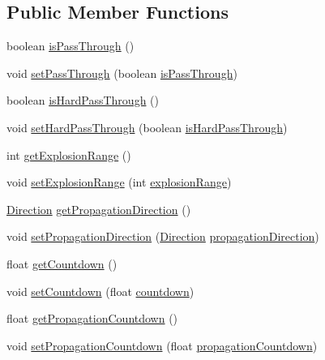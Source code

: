 \subsection*{Public Member Functions}
\begin{DoxyCompactItemize}
\item 
boolean \hyperlink{classbr_1_1unb_1_1unbomber_1_1component_1_1_explosion_aa184c236a60195769dc4c16ae4c7cb64}{is\+Pass\+Through} ()
\item 
void \hyperlink{classbr_1_1unb_1_1unbomber_1_1component_1_1_explosion_ae87c8a59eefdce6d3f6c747feec2ebd2}{set\+Pass\+Through} (boolean \hyperlink{classbr_1_1unb_1_1unbomber_1_1component_1_1_explosion_a09d4a0871d67a4a12a815b354b2272c4}{is\+Pass\+Through})
\item 
boolean \hyperlink{classbr_1_1unb_1_1unbomber_1_1component_1_1_explosion_a361ccb52dcd5922bc52c9e373006c27c}{is\+Hard\+Pass\+Through} ()
\item 
void \hyperlink{classbr_1_1unb_1_1unbomber_1_1component_1_1_explosion_a49bd436b4b1180da8e4ad9f38ba189f4}{set\+Hard\+Pass\+Through} (boolean \hyperlink{classbr_1_1unb_1_1unbomber_1_1component_1_1_explosion_a222793e61a40380a58bab0be162f3088}{is\+Hard\+Pass\+Through})
\item 
int \hyperlink{classbr_1_1unb_1_1unbomber_1_1component_1_1_explosion_ab3fbd42606ad625adcb9f030decdcfb2}{get\+Explosion\+Range} ()
\item 
void \hyperlink{classbr_1_1unb_1_1unbomber_1_1component_1_1_explosion_aaff1ef3e3ba62eed2739ecb1245ef3f6}{set\+Explosion\+Range} (int \hyperlink{classbr_1_1unb_1_1unbomber_1_1component_1_1_explosion_aa8320d23d64b5066cb1c038871d80b90}{explosion\+Range})
\item 
\hyperlink{enumbr_1_1unb_1_1unbomber_1_1component_1_1_direction}{Direction} \hyperlink{classbr_1_1unb_1_1unbomber_1_1component_1_1_explosion_a6c4b805380f1509e0cdb595b5c42b7df}{get\+Propagation\+Direction} ()
\item 
void \hyperlink{classbr_1_1unb_1_1unbomber_1_1component_1_1_explosion_a2c8c31821136f54916ef7a72b3834a45}{set\+Propagation\+Direction} (\hyperlink{enumbr_1_1unb_1_1unbomber_1_1component_1_1_direction}{Direction} \hyperlink{classbr_1_1unb_1_1unbomber_1_1component_1_1_explosion_abf7db2b0cd2eeb4358b6732b07d8e3d1}{propagation\+Direction})
\item 
float \hyperlink{classbr_1_1unb_1_1unbomber_1_1component_1_1_explosion_a3d24659b183a3f526e5b1351af29c0ad}{get\+Countdown} ()
\item 
void \hyperlink{classbr_1_1unb_1_1unbomber_1_1component_1_1_explosion_a343e3012065f6863ab6ee5fa7500c260}{set\+Countdown} (float \hyperlink{classbr_1_1unb_1_1unbomber_1_1component_1_1_explosion_a0b6892a486acfbbc0fc43badd7e76fff}{countdown})
\item 
float \hyperlink{classbr_1_1unb_1_1unbomber_1_1component_1_1_explosion_aa06eea85c1d5c26e46aa2e5798aae4c4}{get\+Propagation\+Countdown} ()
\item 
void \hyperlink{classbr_1_1unb_1_1unbomber_1_1component_1_1_explosion_ac9f60ed69b74f6f779555cd17c6cedcb}{set\+Propagation\+Countdown} (float \hyperlink{classbr_1_1unb_1_1unbomber_1_1component_1_1_explosion_aafd696323afc7a973bb855591c6da12c}{propagation\+Countdown})
\end{DoxyCompactItemize}
